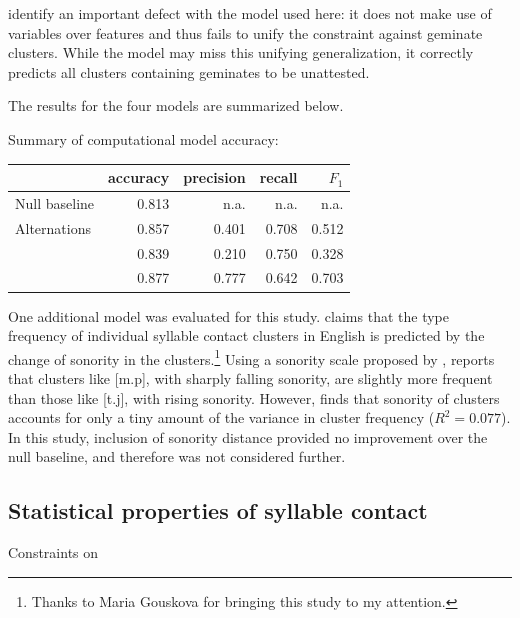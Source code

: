 \citet{Berent2012} identify an important defect with the \citeauthor{Hayes2008a} model used here: it does not make use of variables over features and thus fails to unify the constraint against geminate clusters. While the model may miss this unifying generalization, it correctly predicts all clusters containing geminates to be unattested. 

The results for the four models are summarized below.

\begin{example}
Summary of computational model accuracy: 

\vspace{0.5\baselineskip} 
\begin{tabular}{l | r r r r}
\toprule
                          & accuracy & precision & recall & $F_1$ \\ 
\midrule
Null baseline             & 0.813    & n.a.      & n.a.   & n.a.  \\
Alternations              & 0.857    & 0.401     & 0.708  & 0.512 \\
\citet{Pierrehumbert1994} & 0.839    & 0.210     & 0.750  & 0.328 \\
\citet{Hayes2008a}        & 0.877    & 0.777     & 0.642  & 0.703 \\
\bottomrule
\end{tabular}
\end{example}

One additional model was evaluated for this study. \citet{McGowan2011} claims that the type frequency of individual syllable contact clusters in English is predicted by the change of sonority in the clusters.\footnote{Thanks to Maria Gouskova for bringing this study to my attention.} Using a sonority scale proposed by \citet{Jespersen1904}, \citeauthor{McGowan2011} reports that clusters like [m.p], with sharply falling sonority, are slightly more frequent than those like [t.j], with rising sonority. However, \citeauthor{McGowan2011} finds that sonority of clusters accounts for only a tiny amount of the variance in cluster frequency ($R^2 = 0.077$). In this study, inclusion of sonority distance provided no improvement over the null baseline, and therefore was not considered further.

\subsection{Statistical properties of syllable contact}

Constraints on 

